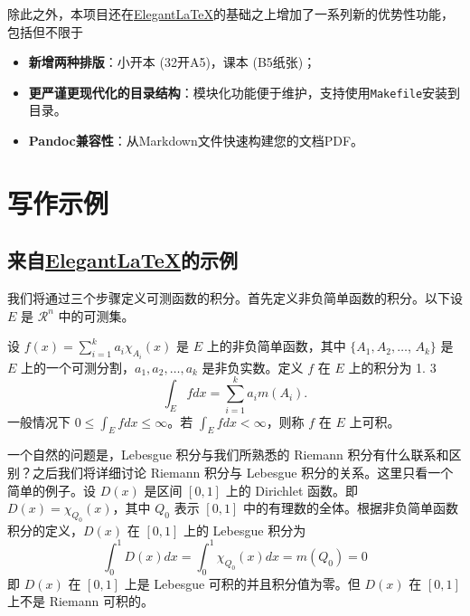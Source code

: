 \documentclass[12pt, textbook]{uglyrep}
\begin{document}
除此之外，本项目还在\href{https://github.com/ElegantLaTeX/}{Elegant\LaTeX}的基础之上增加了一系列新的优势性功能，包括但不限于
\begin{itemize}
  \item \textbf{新增两种排版}：小开本 (32开A5)，课本 (B5纸张)；
  \item \textbf{更严谨更现代化的目录结构}：模块化功能便于维护，支持使用\texttt{Makefile}安装到目录。
  \item \textbf{Pandoc兼容性}：从Markdown文件快速构建您的文档PDF。
\end{itemize}

\chapter{写作示例}

\section{来自\href{https://github.com/ElegantLaTeX/}{Elegant\LaTeX}的示例}

我们将通过三个步骤定义可测函数的积分。首先定义非负简单函数的积分。以下设 $E$ 是 $\mathcal{R}^n$ 中的可测集。

\begin{definition}[可积性]
设 $ f(x)=\sum\limits_{i=1}^{k} a_i \chi_{A_i}(x)$ 是 $E$ 上的非负简单函数，其中 $\{A_1,A_2,\ldots$, $A_k\}$ 是 $E$ 上的一个可测分割，$a_1,a_2,\ldots,a_k$ 是非负实数。定义 $f$ 在 $E$ 上的积分为 1. 3
\begin{equation}
   \label{inter}
   \int_{E} f dx = \sum_{i=1}^k a_i m(A_i).
\end{equation}
一般情况下 $0 \leq \int_{E} f dx \leq \infty$。若 $\int_{E} f dx < \infty$，则称 $f$ 在 $E$ 上可积。
\end{definition}

一个自然的问题是，Lebesgue 积分与我们所熟悉的 Riemann 积分有什么联系和区别？之后我们将详细讨论 Riemann 积分与 Lebesgue 积分的关系。这里只看一个简单的例子。设 $D(x)$ 是区间 $[0,1]$ 上的 Dirichlet 函数。即 $D(x)=\chi_{Q_0}(x)$，其中 $Q_0$ 表示 $[0,1]$ 中的有理数的全体。根据非负简单函数积分的定义，$D(x)$ 在 $[0,1]$ 上的 Lebesgue 积分为
\begin{equation}\label{inter2}
  \int_0^1 D(x)dx = \int_0^1 \chi_{Q_0} (x) dx = m(Q_0) = 0
\end{equation}
即 $D(x)$ 在 $[0,1]$ 上是 Lebesgue 可积的并且积分值为零。但 $D(x)$ 在 $[0,1]$ 上不是 Riemann 可积的。
\end{document}
